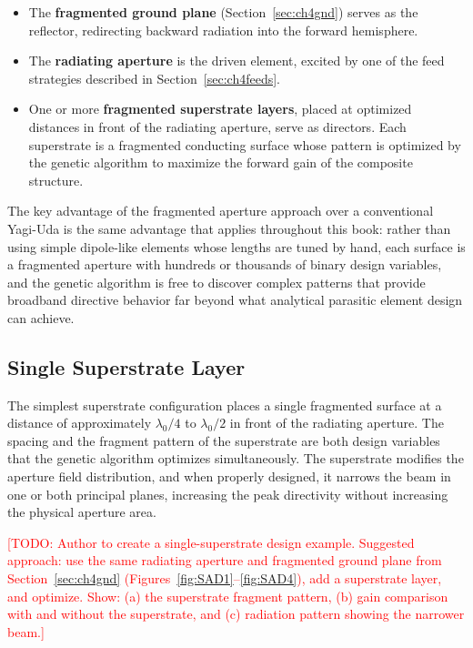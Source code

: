 \begin{itemize}
\item The \textbf{fragmented ground plane} (Section~\ref{sec:ch4gnd}) serves as the reflector, redirecting backward radiation into the forward hemisphere.

\item The \textbf{radiating aperture} is the driven element, excited by one of the feed strategies described in Section~\ref{sec:ch4feeds}.

\item One or more \textbf{fragmented superstrate layers}, placed at optimized distances in front of the radiating aperture, serve as directors.  Each superstrate is a fragmented conducting surface whose pattern is optimized by the genetic algorithm to maximize the forward gain of the composite structure.
\end{itemize}

The key advantage of the fragmented aperture approach over a conventional Yagi-Uda is the same advantage that applies throughout this book: rather than using simple dipole-like elements whose lengths are tuned by hand, each surface is a fragmented aperture with hundreds or thousands of binary design variables, and the genetic algorithm is free to discover complex patterns that provide broadband directive behavior far beyond what analytical parasitic element design can achieve.

\subsection{Single Superstrate Layer}

The simplest superstrate configuration places a single fragmented surface at a distance of approximately $\lambda_0/4$ to $\lambda_0/2$ in front of the radiating aperture.  The spacing and the fragment pattern of the superstrate are both design variables that the genetic algorithm optimizes simultaneously.  The superstrate modifies the aperture field distribution, and when properly designed, it narrows the beam in one or both principal planes, increasing the peak directivity without increasing the physical aperture area.

\textcolor{red}{[TODO: Author to create a single-superstrate design example.  Suggested approach: use the same radiating aperture and fragmented ground plane from Section~\ref{sec:ch4gnd} (Figures~\ref{fig:SAD1}--\ref{fig:SAD4}), add a superstrate layer, and optimize.  Show: (a) the superstrate fragment pattern, (b) gain comparison with and without the superstrate, and (c) radiation pattern showing the narrower beam.]}

